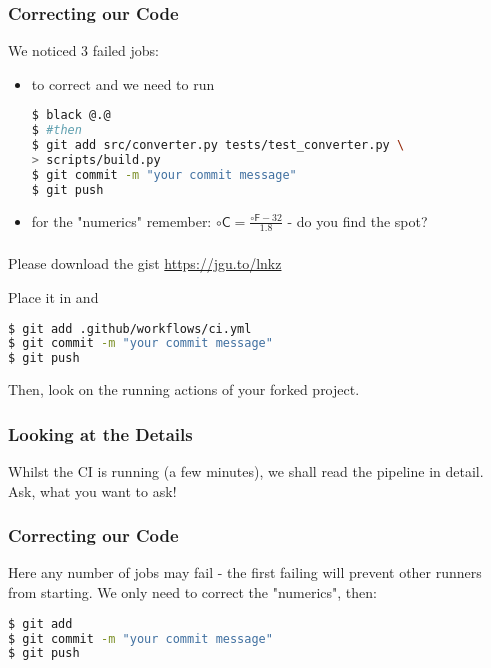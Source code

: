 \begin{frame}[fragile]
	\frametitle{Correcting our Code}
	We noticed 3 failed jobs:
	\begin{itemize}[<+->]
		\item to correct  and  we need to run
		      \begin{lstlisting}[language=Bash, style=Shell]
$ black @.@
$ #then
$ git add src/converter.py tests/test_converter.py \
> scripts/build.py
$ git commit -m "your commit message"
$ git push
		      \end{lstlisting}
	     \item for the "numerics" remember: $\circ\mathsf{C} = \frac{\circ\mathsf{F} - 32}{1.8}$ - do you find the spot?
	\end{itemize}
\end{frame}


\begin{frame}[fragile]
	\frametitle{ }
	\begin{task}
		{Please download the gist \url{https://jgu.to/lnkz}}
	\end{task}
	Place it in  and
	\begin{lstlisting}[language=Bash, style=Shell]
$ git add .github/workflows/ci.yml
$ git commit -m "your commit message"
$ git push
	\end{lstlisting}
	Then, look on the running actions of your forked project.
\end{frame}

\begin{frame}[fragile]
	\frametitle{Looking at the Details}
	\begin{task}
		{Whilst the CI is running (a few minutes), we shall read the pipeline in detail. Ask, what you want to ask!}
	\end{task}
\end{frame}

\begin{frame}[fragile]
	\frametitle{Correcting our Code}
	Here any number of jobs may fail - the first failing will prevent other runners from starting. We only need to correct the "numerics", then:
	\begin{lstlisting}[language=Bash, style=Shell]
$ git add 
$ git commit -m "your commit message"
$ git push
	\end{lstlisting}
\end{frame}